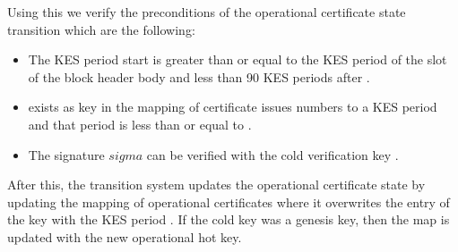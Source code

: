 Using this we verify the preconditions of the operational certificate state
transition which are the following:

\begin{itemize}
\item The KES period start  is greater than or equal to the KES period of
  the slot of the block header body and less than 90 KES periods after .
\item {} exists as key in the mapping of certificate issues numbers to a KES
  period  and that period is less than or equal to .
\item The signature $sigma$ can be verified with the cold verification key
  .
\end{itemize}

After this, the transition system updates the operational certificate state by
updating the mapping of operational certificates where it overwrites the entry
of the key  with the KES period .
If the cold key was a genesis key, then the  map is updated with the new
operational hot key.

